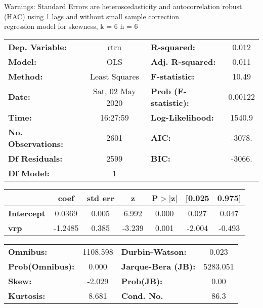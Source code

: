 Warnings: \newline
 [1] Standard Errors are heteroscedasticity and autocorrelation robust (HAC) using 1 lags and without small sample correction\\ 

regression model for skewness, k = 6 h = 6\begin{center}
\begin{tabular}{lclc}
\toprule
\textbf{Dep. Variable:}    &       rtrn       & \textbf{  R-squared:         } &     0.012   \\
\textbf{Model:}            &       OLS        & \textbf{  Adj. R-squared:    } &     0.011   \\
\textbf{Method:}           &  Least Squares   & \textbf{  F-statistic:       } &     10.49   \\
\textbf{Date:}             & Sat, 02 May 2020 & \textbf{  Prob (F-statistic):} &  0.00122    \\
\textbf{Time:}             &     16:27:59     & \textbf{  Log-Likelihood:    } &    1540.9   \\
\textbf{No. Observations:} &        2601      & \textbf{  AIC:               } &    -3078.   \\
\textbf{Df Residuals:}     &        2599      & \textbf{  BIC:               } &    -3066.   \\
\textbf{Df Model:}         &           1      & \textbf{                     } &             \\
\bottomrule
\end{tabular}
\begin{tabular}{lcccccc}
                   & \textbf{coef} & \textbf{std err} & \textbf{z} & \textbf{P$> |$z$|$} & \textbf{[0.025} & \textbf{0.975]}  \\
\midrule
\textbf{Intercept} &       0.0369  &        0.005     &     6.992  &         0.000        &        0.027    &        0.047     \\
\textbf{vrp}       &      -1.2485  &        0.385     &    -3.239  &         0.001        &       -2.004    &       -0.493     \\
\bottomrule
\end{tabular}
\begin{tabular}{lclc}
\textbf{Omnibus:}       & 1108.598 & \textbf{  Durbin-Watson:     } &    0.023  \\
\textbf{Prob(Omnibus):} &   0.000  & \textbf{  Jarque-Bera (JB):  } & 5283.051  \\
\textbf{Skew:}          &  -2.029  & \textbf{  Prob(JB):          } &     0.00  \\
\textbf{Kurtosis:}      &   8.681  & \textbf{  Cond. No.          } &     86.3  \\
\bottomrule
\end{tabular}
\end{center}

